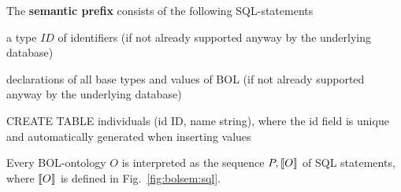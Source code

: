 \begin{definition}\label{def:bolsem:sql}
The \textbf{semantic prefix} consists of the following SQL-statements
\begin{compactitem}
 \item a type $ID$ of identifiers (if not already supported anyway by the underlying database)
 \item declarations of all base types and values of BOL (if not already supported anyway by the underlying database)
 \item CREATE TABLE individuals (id ID, name string), where the id field is unique and automatically generated when inserting values
\end{compactitem}

Every BOL-ontology $O$ is interpreted as the sequence $P,\llbracket O\rrbracket$ of SQL statements, where $\llbracket O\rrbracket$ is defined in Fig.~\ref{fig:bolsem:sql}.
\end{definition}

